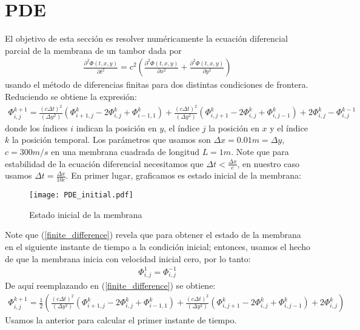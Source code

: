 \documentclass{article}
\begin{document}
	\section{PDE}
	El objetivo de esta sección es resolver numéricamente la ecuación diferencial parcial de la membrana de un tambor dada por
	\begin{align}\label{finite_difference}
		\frac{\partial^2 \Phi(t,x,y)}{\partial t^2} = c^2\left(\frac{\partial^2 \Phi(t,x,y)}{\partial x^2} + \frac{\partial^2 \Phi(t,x,y)}{\partial y^2}\right)
	\end{align}
	usando el método de diferencias finitas para dos distintas condiciones de frontera. Reduciendo se obtiene la expresión:
	\begin{align*}
		\Phi^{k+1}_{i,j} = \frac{(c\Delta t)^2}{(\Delta y^2)}\left(\Phi_{i+1,j}^{k} - 2\Phi_{i,j}^{k} + \Phi_{i-1,1}^{k}\right) + \frac{(c\Delta t)^2}{(\Delta y^2)}\left(\Phi_{i,j+1}^{k} - 2\Phi_{i,j}^{k} + \Phi_{i,j-1}^{k}\right) + 2\Phi_{i,j}^{k} - \Phi_{i,j}^{k-1}
	\end{align*}
	donde los índices $i$ indican la posición en $y$, el índice $j$ la posición en $x$ y el índice $k$ la posición temporal. Los parámetros que usamos son $\Delta x = 0.01m = \Delta y$, $c=300 m/s$ en una membrana cuadrada de longitud $L=1m$. Note que para estabilidad de la ecuación diferencial necesitamos que $\Delta t < \frac{\Delta x}{c}$, en nuestro caso usamos $\Delta t =  \frac{\Delta x}{10c}$. En primer lugar, graficamos es estado inicial de la membrana:
	\begin{figure}[H]
		\centering
		\texttt{[image: PDE\_initial.pdf]}
		\caption{Estado inicial de la membrana}
		\label{fig:PDE_initiall}
	\end{figure}
	Note que (\ref{finite_difference}) revela que para obtener el estado de la membrana en el siguiente instante de tiempo a la condición inicial; entonces, usamos el hecho de que la membrana inicia con velocidad inicial cero, por lo tanto:
	\begin{align*}
		\Phi^1_{i,j} = \Phi^{-1}_{i,j}
	\end{align*}
	De aquí reemplazando en (\ref{finite_difference}) se obtiene:
	\begin{align*}
		\Phi^{k+1}_{i,j} = \frac{1}{2}\left(\frac{(c\Delta t)^2}{(\Delta y^2)}\left(\Phi_{i+1,j}^{k} - 2\Phi_{i,j}^{k} + \Phi_{i-1,1}^{k}\right) + \frac{(c\Delta t)^2}{(\Delta y^2)}\left(\Phi_{i,j+1}^{k} - 2\Phi_{i,j}^{k} + \Phi_{i,j-1}^{k}\right) + 2\Phi_{i,j}^{k}\right)
	\end{align*}
	Usamos la anterior para calcular el primer instante de tiempo.
\end{document}
